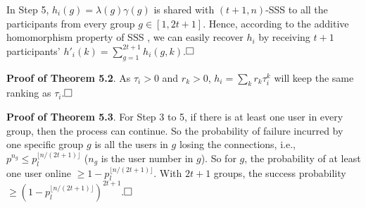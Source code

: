 \documentclass[11pt]{article}
\begin{document}
In Step 5, $h_i(g)=\lambda(g)\gamma(g)$ is shared with $(t+1,n)$-SSS to all the participants from every group $g \in [1, 2t+1]$. Hence, according to the additive homomorphism property of SSS \cite{Leye-shamir1979share}, we can easily recover $h_i$ by receiving $t+1$ participants'  $h'_i(k) = \sum_{g=1}^{2t+1} h_i(g, k)$.$\qed$

\vspace{+.5em}

\noindent \textbf{Proof of Theorem 5.2}. As $\tau_i>0$ and $r_k>0$, $h_i=\sum_k r_k\tau_i^k$ will keep the same ranking as $\tau_i$.$\qed$


\vspace{+.5em}

\noindent \textbf{Proof of Theorem 5.3}. For Step 3 to 5, if there is at least one user in every group, then the process can continue. So the probability of failure incurred by one specific group $g$ is all the users in $g$ losing the connections, i.e., $p^{n_g} \le p_l^{\lfloor n/(2t+1) \rfloor}$ ($n_g$ is the user number in $g$). So for $g$, the probability of at least one user online $\ge 1-p_l^{\lfloor n/(2t+1) \rfloor}$. With $2t+1$ groups, the success probability $\ge (1-p_l^{\lfloor n/(2t+1) \rfloor})^{2t+1}$.$\qed$
\end{document}
